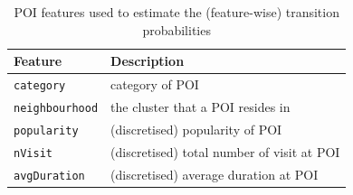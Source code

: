 \documentclass[9pt]{extarticle}
\begin{document}
\begin{table}[ht]
\caption{POI features used to estimate the (feature-wise) transition probabilities}
\label{tab:tranfeature}
\centering
\begin{tabular}{l|l} \hline
\textbf{Feature}       & \textbf{Description} \\ \hline
\texttt{category}      & category of POI \\
\texttt{neighbourhood} & the cluster that a POI resides in \\
\texttt{popularity}    & (discretised) popularity of POI \\
\texttt{nVisit}        & (discretised) total number of visit at POI \\
\texttt{avgDuration}   & (discretised) average duration at POI \\ \hline
\end{tabular}
\end{table}





\end{document}
